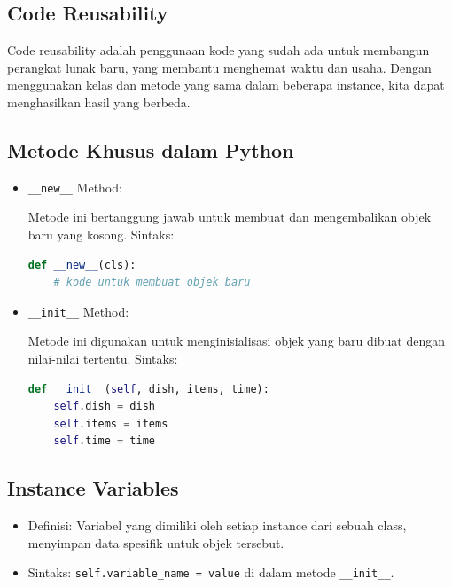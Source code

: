 \documentclass{article}
\begin{document}
\subsection{Code Reusability}
Code reusability adalah penggunaan kode yang sudah ada untuk membangun perangkat lunak baru, yang membantu menghemat waktu dan usaha. Dengan menggunakan kelas dan metode yang sama dalam beberapa instance, kita dapat menghasilkan hasil yang berbeda.

\subsection{Metode Khusus dalam Python}
\begin{itemize}
    \item \verb|__new__| Method:

          Metode ini bertanggung jawab untuk membuat dan mengembalikan objek baru yang kosong.
          Sintaks:
          \begin{lstlisting}[language=Python, caption={}, captionpos=b]
def __new__(cls):
    # kode untuk membuat objek baru
\end{lstlisting}
    \item \verb|__init__| Method:

          Metode ini digunakan untuk menginisialisasi objek yang baru dibuat dengan nilai-nilai tertentu.
          Sintaks:
          \begin{lstlisting}[language=Python, caption={}, captionpos=b]
def __init__(self, dish, items, time):
    self.dish = dish
    self.items = items
    self.time = time
\end{lstlisting}
\end{itemize}

\subsection{Instance Variables}
\begin{itemize}
    \item Definisi: Variabel yang dimiliki oleh setiap instance dari sebuah class, menyimpan data spesifik untuk objek tersebut.
    \item Sintaks: \verb|self.variable_name = value| di dalam metode \verb|__init__|.
\end{itemize}
\end{document}
